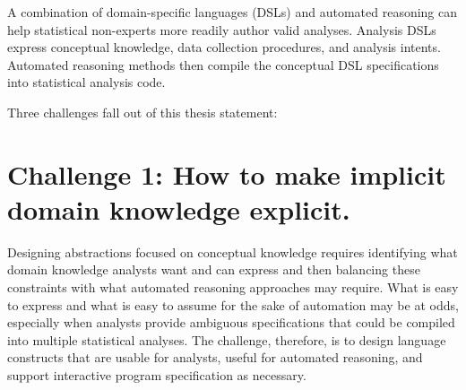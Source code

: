 
A combination of domain-specific languages (DSLs) and automated reasoning can
help statistical non-experts more readily author valid analyses. Analysis DSLs
express conceptual knowledge, data collection procedures, and
analysis intents. Automated reasoning methods then compile the conceptual
DSL specifications into statistical analysis code.


Three challenges fall out of this thesis statement: 

\section*{Challenge 1: How to make implicit domain knowledge explicit.} %
Designing abstractions focused on conceptual knowledge requires identifying what
domain knowledge analysts want and can express and then balancing these
constraints with what automated reasoning approaches may require. What is easy
to express and what is easy to assume for the sake of automation may be at odds,
especially when analysts provide ambiguous specifications that could be compiled
into multiple statistical analyses. The challenge, therefore, is to design
language constructs that are usable for analysts, useful for automated
reasoning, and support interactive program specification as necessary.




